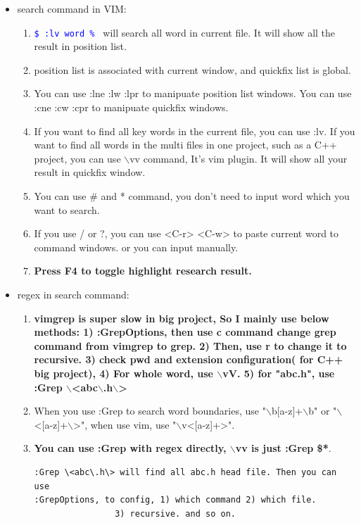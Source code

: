 \documentclass[a4paper,11pt,twoside]{book}
\newcommand{\linuxcommand}[1]{\texttt{\textcolor{blue}{\$ #1 \Pisymbol{psy}{191}}}}
\begin{document}
\begin{itemize}
\item search command in VIM:
		\begin{enumerate}
				\item \linuxcommand{:lv word \%} will search all word in current file. It will show all the result in position list. 

				\item position list is associated with current window, and quickfix list is global.

				\item You can use :lne :lw :lpr to manipuate position list windows. You can use :cne :cw :cpr to manipuate quickfix windows. 

				\item If you want to find all key words in the current file, you can use :lv. If you want to find all words in the multi files in one project, such as a C++ project, you can use $\backslash$vv command, It's vim plugin. It will show all your result in quickfix window. 

				\item You can use \# and * command, you don't need to input word which you want to search. 

				\item If you use / or ?, you can use <C-r> <C-w> to paste current word to command windows. or you can input manually. 

				\item \textbf{Press F4 to toggle highlight research result.} 

		\end{enumerate}

\item regex in search command:
		\begin{enumerate}

            \item \textbf{vimgrep is super slow in big project, So I mainly use below methods: 1) :GrepOptions, then use c command change grep command from vimgrep to grep. 2) Then, use r to change it to recursive. 3) check pwd and extension configuration( for C++ big project), 4) For whole word, use $\backslash$vV. 5) for "abc.h", use :Grep $\backslash$<abc$\backslash$.h$\backslash$> }

            \item When you use :Grep to search word boundaries, use "$\backslash$b[a-z]+$\backslash$b" or "$\backslash$<[a-z]+$\backslash$>", when use vim, use "$\backslash$v<[a-z]+>". 
            \item \textbf{You can use :Grep with regex directly, $\backslash$vv is just :Grep \$*}. 
\begin{verbatim}
:Grep \<abc\.h\> will find all abc.h head file. Then you can use
:GrepOptions, to config, 1) which command 2) which file. 
                3) recursive. and so on. 
\end{verbatim}	


\end{enumerate}
\end{itemize}
\end{document}

